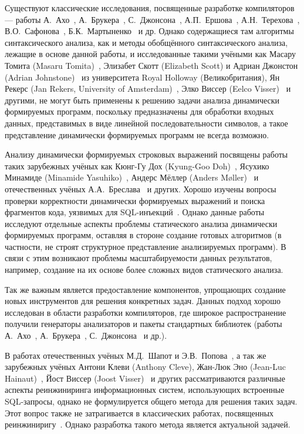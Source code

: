 Существуют классические исследования, посвященные разработке компиляторов --- работы А.~Ахо~\cite{Dragon}, А.~Брукера~\cite{CompilerCompiler}, С.~Джонсона~\cite{yaccBook}, А.П.~Ершова~\cite{Ershov1,Ershov2},   А.Н.~Терехова~\cite{ANTCompiler}, В.О.~Сафонова~\cite{safonov}, Б.К.~Мартыненко~\cite{Martinenko1, Martinenko2}  и др.  Однако содержащиеся там алгоритмы синтаксического анализа, как и методы обобщённого синтаксического анализа, лежащие в основе данной работы, и исследованные такими учёными как Масару Томита (Masaru Tomita)~\cite{Tomita}, Элизабет Скотт (Elizabeth Scott) и Адриан Джонстон (Adrian Johnstone)~\cite{RNGLR,RIGLR} из университета Royal Holloway (Великобритания), Ян Рекерс (Jan Rekers, University of Amsterdam)~\cite{SPPF}, Элко Виссер (Eelco Visser)~\cite{RNGLRSyntaxerror2,RNGLRSyntaxerror3} и другими, не могут быть применены к решению задачи анализа динамически формируемых программ, поскольку предназначены для обработки входных данных, представимых в виде линейной последовательности символов, а такое представление динамически формируемых программ не всегда возможно.

Анализу динамически формируемых строковых выражений посвящены работы таких зарубежных учёных как Кюнг-Гу Дох (Kyung-Goo Doh)~\cite{LrAbstract1,LrAbstract2,LRAbstractParsingSema}, Ясухико Минамиде (Minamide Yasuhiko)~\cite{PHPSA}, Андерс Мёллер (Anders M{\o}ller)~\cite{JSA} и отечественных учёных А.А.~Бреслава~\cite{Alvor1,Alvor2} и других. Хорошо изучены вопросы проверки корректности динамически формируемых выражений и поиска фрагментов кода, уязвимых для SQL-инъекций~\cite{SQLInjection,Dasgupta:2009:SAF:1546683.1547548}. Однако данные работы исследуют отдельные аспекты проблемы статического анализа динамически формируемых программ, оставляя в стороне создание готовых алгоритмов (в частности, не строят структурное представление анализируемых программ). В связи с этим возникают проблемы масштабируемости данных результатов, например, создание на их основе более сложных видов статического анализа.

Так же важным является предоставление компонентов, упрощающих создание новых инструментов для решения конкретных задач. Данных подход хорошо исследован в области разработки компиляторов, где широкое распространение получили генераторы анализаторов и пакеты стандартных библиотек (работы А.~Ахо~\cite{Dragon}, А.~Брукера~\cite{CompilerCompiler}, С.~Джонсона~\cite{yaccBook} и др.). 

В работах отечественных учёных М.Д.~Шапот и Э.В.~Попова~\cite{DynamicDSQLTranslation}, а так же зарубежных учёных Антони Клеви (Anthony Cleve), Жан-Люк Эно (Jean-Luc Hainaut)~\cite{DSQLReverseEngineering}, Йост Виссер (Joost Visser)~\cite{DSQLQualityMesure} и других рассматриваются различные аспекты реинжиниринга информационных систем, использующих встроенные SQL-запросы, однако не формулируется общего метода для решения таких задач. Этот вопрос также не затрагивается в классических работах, посвященных реинжиниригу~\cite{SoftwareReeng1, reengANT, SoftwareReeng2, SoftwareReeng3}. Однако разработка такого метода является актуальной задачей.

